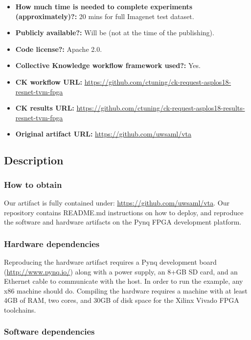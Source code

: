 \documentclass[sigconf]{acmart}
\begin{document}
\begin{itemize}
  \item {\bf How much time is needed to complete experiments (approximately)?:} 20 mins for full Imagenet test dataset.
  \item {\bf Publicly available?:} Will be (not at the time of the publishing).
  \item {\bf Code license?:} Apache 2.0.
  \item {\bf Collective Knowledge workflow framework used?:} Yes.
  \item {\bf CK workflow URL:} \url{https://github.com/ctuning/ck-request-asplos18-resnet-tvm-fpga}
  \item {\bf CK results URL:} \url{https://github.com/ctuning/ck-request-asplos18-results-resnet-tvm-fpga}
  \item {\bf Original artifact URL:} \url{https://github.com/uwsaml/vta}
\end{itemize}

\subsection{Description}

\subsubsection{How to obtain}

Our artifact is fully contained under: \url{https://github.com/uwsaml/vta}.
Our repository contains README.md instructions on how to deploy, and reproduce the software and hardware artifacts on the Pynq FPGA development platform.

\subsubsection{Hardware dependencies}

Reproducing the hardware artifact requires a Pynq development board (\url{http://www.pynq.io/}) along with a power supply, an 8+GB SD card, and an Ethernet cable to communicate with the host. In order to run the example, any x86 machine should do. Compiling the hardware requires a machine with at least 4GB of RAM, two cores, and 30GB of disk space for the Xilinx Vivado FPGA toolchains.

\subsubsection{Software dependencies}
\end{document}
